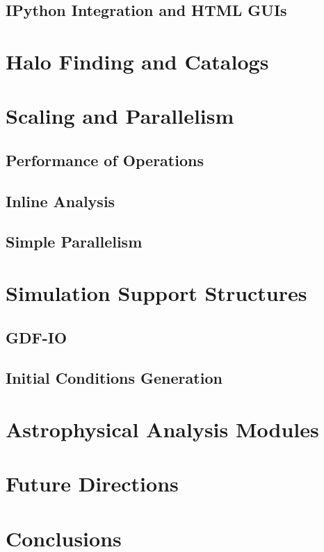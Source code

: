 \documentclass{emulateapj}
\begin{document}
\subsection{IPython Integration and HTML GUIs}

\section{Halo Finding and Catalogs}

\section{Scaling and Parallelism}

\subsection{Performance of Operations}

\subsection{Inline Analysis}

\subsection{Simple Parallelism}

\section{Simulation Support Structures}

\subsection{GDF-IO}

\subsection{Initial Conditions Generation}

\section{Astrophysical Analysis Modules}

\section{Future Directions}

\section{Conclusions}\label{sec:conclusions}

\acknowledgments 

%
\end{document}
